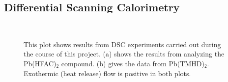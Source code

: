 
\subsection{Differential Scanning Calorimetry}
\label{sup:Thermal-Results-DSC}

\begin{figure}[htbp]
   \centering
    \\
   \caption[Results of DSC Experiments]%
   		{This plot shows results from DSC experiments carried out during the course of %
		this project. (a) shows the results from analyzing the Pb(HFAC)$_{2}$ compound. (b) gives %
		the data from Pb(TMHD)$_{2}$. Exothermic (heat release) flow is positive in both plots. }
   \label{fig:DSC-Data}
\end{figure}


